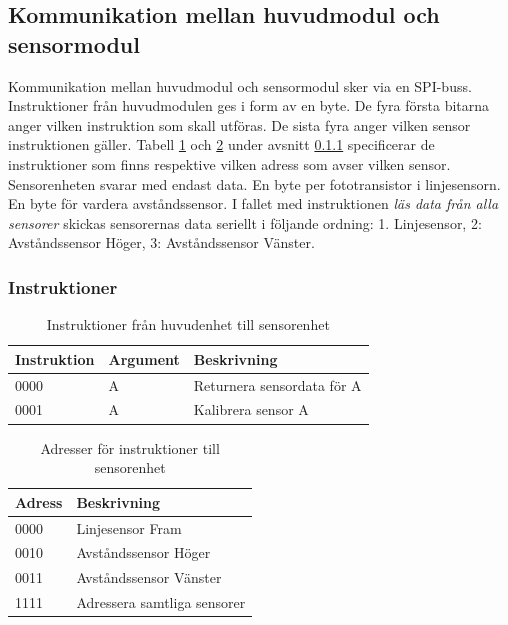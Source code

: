 
\subsection{Kommunikation mellan huvudmodul och sensormodul}
Kommunikation mellan huvudmodul och sensormodul sker via en SPI-buss. Instruktioner från huvudmodulen ges i form av en byte. De fyra första bitarna anger vilken instruktion som skall utföras. De sista fyra anger vilken sensor instruktionen gäller. Tabell \ref{protokoll:huvud-sensor} och \ref{protokoll:huvud-sensor-adress} under avsnitt \ref{designspec:protokoll-huvud-sensor-instr} specificerar de instruktioner som finns respektive vilken adress som avser vilken sensor. \\
Sensorenheten svarar med endast data. En byte per fototransistor i linjesensorn. En byte för vardera avståndssensor. I fallet med instruktionen \textit{läs data från alla sensorer} skickas sensorernas data seriellt i följande ordning: 1. Linjesensor, 2: Avståndssensor Höger, 3: Avståndssensor Vänster.

\subsubsection{Instruktioner} \label{designspec:protokoll-huvud-sensor-instr}

\begin{table}[h]
	\centering
		\begin{tabularx}{\textwidth}{| l | l | X |}
			\hline
			\textbf{Instruktion} & \textbf{Argument} & \textbf{Beskrivning} \\
			\hline
			{0000} & {A} & {Returnera sensordata för A} \\
			\hline
			{0001} & {A} & {Kalibrera sensor A} \\
			\hline
		\end{tabularx}
	\caption{Instruktioner från huvudenhet till sensorenhet} \label{protokoll:huvud-sensor}
\end{table}

\begin{table}[h]
	\centering
		\begin{tabularx}{\textwidth}{| l | X |}
			\hline
			\textbf{Adress} & \textbf{Beskrivning} \\
			\hline
			{0000} & {Linjesensor Fram} \\
			\hline
			{0010} & {Avståndssensor Höger} \\
			\hline
			{0011} & {Avståndssensor Vänster} \\
			\hline
			{1111} & {Adressera samtliga sensorer} \\
			\hline
		\end{tabularx}
	\caption{Adresser för instruktioner till sensorenhet} \label{protokoll:huvud-sensor-adress}
\end{table}

